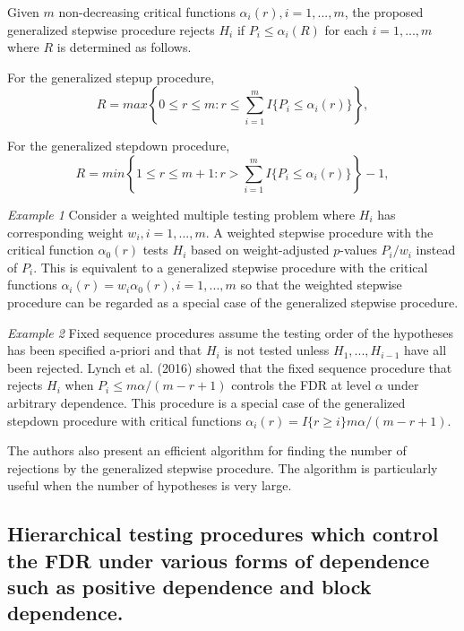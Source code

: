 \documentclass{article}
\begin{document}
Given $m$ non-decreasing critical functions $\alpha_i(r), i = 1,...,m$, the proposed generalized stepwise procedure rejects $H_i$ if $P_i \leq \alpha_i(R)$ for each $i = 1,...,m$ where $R$ is determined as follows. 

For the generalized stepup procedure,
$$  R = max \left\{0 \leq r \leq m: r \leq \sum_{i=1}^m I\{P_i \leq \alpha_i(r)\}\right\}, $$

For the generalized stepdown procedure,
$$ R =min\left\{1 \leq r \leq m+1: r > \sum_{i=1}^mI\{P_i \leq \alpha_i(r)\}\right\} -1, $$

\vspace{3mm}

\textit{Example 1} Consider a weighted multiple testing problem where $H_i$ has corresponding weight $w_i, i = 1,...,m$. A weighted stepwise procedure with the critical function $\alpha_0(r)$ tests $H_i$ based on weight-adjusted $p$-values $P_i/w_i$ instead of
 $P_i$. This is equivalent to a generalized stepwise procedure with the critical functions $\alpha_i(r) = w_i\alpha_0(r), i = 1,...,m$ so that the weighted stepwise procedure can be regarded as a special case of the generalized stepwise procedure.
 
 \vspace{3mm}
 
 \textit{Example 2} Fixed sequence procedures assume the testing order of the hypotheses has been specified a-priori and that $H_i$ is not tested unless $H_1,...,H_{i-1}$ have all been rejected. Lynch
 et al. (2016) showed that the fixed sequence procedure that rejects $H_i$ when $P_i \leq m\alpha/(m-r+1)$ controls the FDR at level $\alpha$ under arbitrary dependence. This procedure is a special case of the generalized stepdown procedure with critical functions $\alpha_i(r) = I\{r \geq i\}m\alpha/(m-r+1)$.
 
 \vspace{3mm}
 
 The authors also present an efficient algorithm for finding the number of rejections by the generalized stepwise procedure. The algorithm is particularly useful when the number of hypotheses is very large.
 


\subsection{Hierarchical testing procedures which control the FDR under various forms of dependence such as positive dependence and block dependence.}
\end{document}
